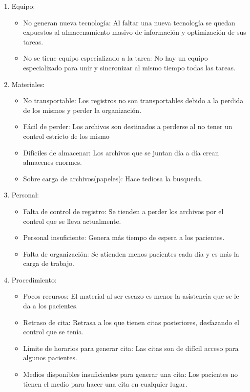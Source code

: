 \begin{enumerate}
\item Equipo:
\begin{itemize}
\item No generan nueva tecnología: Al faltar una nueva tecnología se quedan expuestos al almacenamiento masivo de información y optimización de sus tareas.
\item No se tiene equipo especializado a la tarea: No hay un equipo especializado para unir y sincronizar al mismo tiempo todas las tareas.
\end{itemize}
\item Materiales:
\begin{itemize}
\item No transportable: Los registros no son transportables debido a la perdida de los mismos y perder la organización.
\item Fácil de perder: Los archivos son destinados a perderse al no tener un control estricto de los mismo
\item Difíciles de almacenar: Los archivos que se juntan día a día crean almacenes enormes.
\item Sobre carga de archivos(papeles): Hace tediosa la busqueda.
\end{itemize}
\item Personal:
\begin{itemize}
\item Falta de control de registro: Se tienden a perder los archivos por el control que se lleva actualmente.
\item Personal insuficiente: Genera más tiempo de espera a los pacientes. 
\item Falta de organización: Se atienden menos pacientes cada día y es más la carga de trabajo.
\end{itemize}
\item Procedimiento:
\begin{itemize}
\item Pocos recursos: El material al ser escazo es menor la asistencia que se le da a los pacientes.
\item Retraso de cita: Retrasa a los que tienen citas posteriores, desfazando el control que se tenía.
\item Límite de horarios para generar cita: Las citas son de difícil acceso para algunos pacientes.
\item Medios disponibles insuficientes para generar una cita: Los pacientes no tienen el medio para hacer una cita en cualquier lugar.
\end{itemize}
\end{enumerate}

